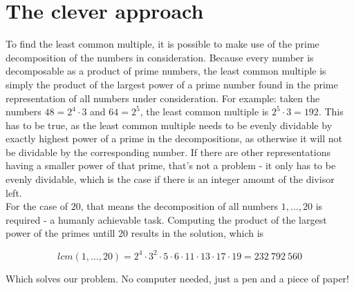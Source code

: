 \documentclass[10pt,a4paper]{article}
\begin{document}
\section{The clever approach}
To find the least common multiple, it is possible to make use of the prime decomposition of the numbers in consideration. Because every number is decomposable as a product of prime numbers, the least common multiple is simply the product of the largest power of a prime number found in the prime representation of all numbers under consideration. For example: taken the numbers $48 = 2^4 \cdot 3$ and $64 = 2^5$, the least common multiple is $2^5 \cdot 3 = 192$. This has to be true, as the least common multiple needs to be evenly dividable by exactly highest power of a prime in the decompositions, as otherwise it will not be dividable by the corresponding number. If there are other representations having a smaller power of that prime, that's not a problem - it only has to be evenly dividable, which is the case if there is an integer amount of the divisor left.\\

For the case of $20$, that means the decomposition of all numbers ${1, ..., 20}$ is required - a humanly achievable task. Computing the product of the largest power of the primes untill $20$ results in the solution, which is

\begin{equation}
lcm({1, ..., 20}) = 2^4 \cdot 3^2 \cdot 5 \cdot 6 \cdot 11 \cdot 13 \cdot 17 \cdot 19 = 232\ 792\ 560
\label{eq:solution}
\end{equation}

Which solves our problem. No computer needed, just a pen and a piece of paper!
\end{document}
